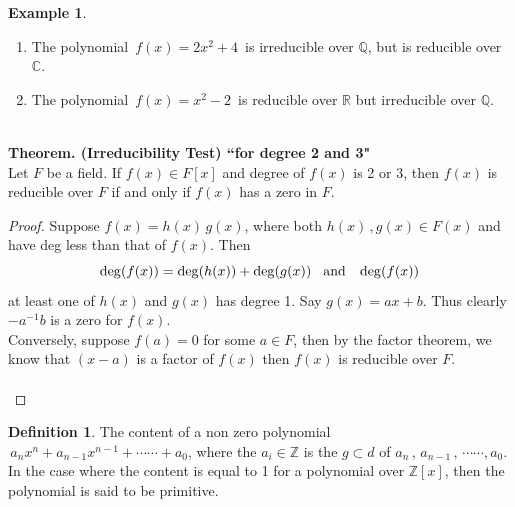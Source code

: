\documentclass[11pt,a4paper]{article}
\theoremstyle{definition}
\newtheorem{defn}[thm]{Definition}
\newtheorem{exa}[thm]{Example}
\begin{document}
\begin{exa}
\begin{enumerate}
\item The polynomial $\, f(x) = 2x^2 + 4\,$ is irreducible over $\mathbb{Q}$, but is reducible over $\mathbb{C}$.

\item The polynomial $\, f(x) = x^2 - 2\,$ is reducible over $\mathbb{R}$ but irreducible over $\mathbb{Q}$.\\\\
\end{enumerate}
\end{exa}





\textbf{Theorem. (Irreducibility Test) ``for degree 2 and 3"}\\
Let $F$ be a field. If $f(x)\in F[x]$ and degree of $f(x)$ is 2 or 3, then $f(x)$ is reducible over $F$ if and only if $f(x)$ has a zero in $F$.\\

\begin{proof}
Suppose $f(x) = h(x)\, g(x)$, where both $h(x)\, , g(x)\in F(x)$ and have deg less than that of $f(x)$. Then $$\deg (f(x)) = \deg (h(x)) + \deg (g(x))\hspace{0.3cm}\text{and}\hspace{0.3cm} \deg (f(x))$$
at least one of  $h(x)$ and $g(x)$ has degree 1. Say $g(x) = ax + b$. Thus clearly $-a^{-1}b$ is a zero for $f(x)$.\\
Conversely, suppose $f(a) = 0$ for some $a\in F$, then by the factor theorem, we know that $(x - a)$ is a factor of $f(x)$ then $f(x)$ is reducible over $F$.\\\\
\end{proof}





\begin{defn}
The content of a non zero polynomial $\, a_n x^n + a_{n-1} x^{n - 1} + \cdots\cdots + a_0$, where the $a_i \in \mathbb{Z}$ is the $g\subset d $ of $a_n\, ,\, a_{n-1}\, , \, \cdots\cdots, a_0$.\\
In the case where the content is equal to 1 for a polynomial over $\mathbb{Z}[x]$, then the polynomial is said to be primitive.\\\\
\end{defn}
\end{document}

